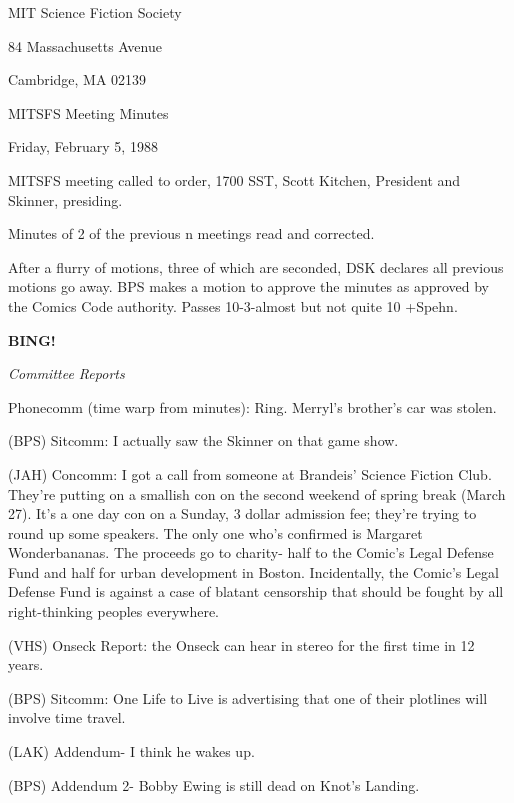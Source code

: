 \documentclass[12pt]{article}
\newcommand{\bing}{{\bf BING!} }
\newcommand{\goto}[1]{\bing \vskip 12pt \centerline{{\em{#1}}}}
\begin{document}
\begin{center}

MIT Science Fiction Society 

84 Massachusetts Avenue

Cambridge, MA 02139

\vspace{12pt}

MITSFS Meeting Minutes 

Friday, February 5, 1988

\end{center}
 
\vspace{18pt}

\setlength{\parskip}{6pt}

\noindent
MITSFS meeting called to order, 1700 SST,
Scott Kitchen, President and Skinner, presiding.

Minutes of 2 of the previous n meetings read and corrected.

After a flurry of motions, three of which are seconded, DSK declares all previous motions go away. BPS makes a motion to approve the minutes as approved by the Comics Code authority. Passes 10-3-almost but not quite 10 +Spehn.

\goto{Committee Reports}

Phonecomm (time warp from minutes): Ring. Merryl's brother's car was stolen.

(BPS) Sitcomm: I actually saw the Skinner on that game show.

(JAH) Concomm: I got a call from someone at Brandeis' Science Fiction Club. They're putting on a smallish con on the second weekend of spring break (March 27). It's a one day con on a Sunday, 3 dollar admission fee; they're trying to round up some speakers. The only one who's confirmed is Margaret Wonderbananas. The proceeds go to charity- half to the Comic's Legal Defense Fund and half for urban development in Boston. Incidentally, the Comic's Legal Defense Fund is against a case of blatant censorship that should be fought by all right-thinking peoples everywhere.

(VHS) Onseck Report: the Onseck can hear in stereo for the first time in 12 years.

(BPS) Sitcomm: One Life to Live is advertising that one of their plotlines will involve time travel.

(LAK) Addendum- I think he wakes up.

(BPS) Addendum 2- Bobby Ewing is still dead on Knot's Landing.
\end{document}
